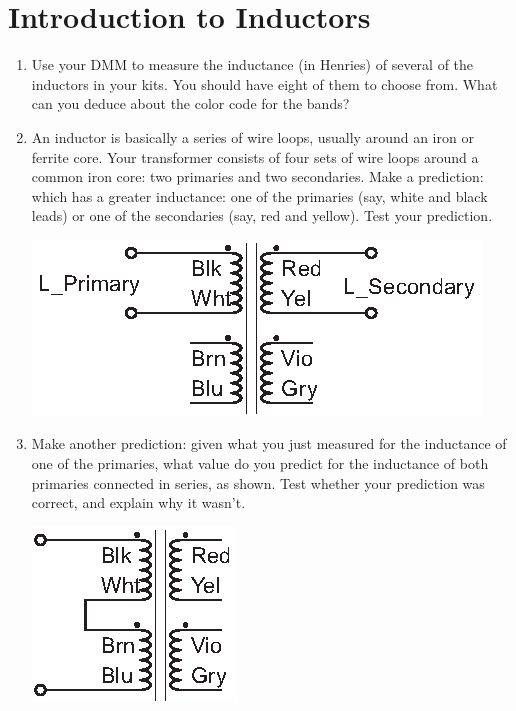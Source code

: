 \section{Introduction to Inductors}
\label{lab_inductors}


\bigskip

\begin{enumerate}[wide]

\item Use your DMM to measure the inductance (in Henries) of several of the inductors in your kits.  You should have eight of them to choose from.  What can you deduce about the color code for the bands?

\item An inductor is basically a series of wire loops, usually around an iron or ferrite core.  Your transformer consists of four sets of wire loops around a common iron core: two primaries and two secondaries.  Make a prediction: which has a greater inductance: one of the primaries (say, white and black leads) or one of the secondaries (say, red and yellow).  Test your prediction.
\begin{center}
\includegraphics{inductors/transformer_as_inductor1.eps}
\end{center}

\item Make another prediction: given what you just measured for the inductance of one of the primaries, what value do you predict for the inductance of both primaries connected in series, as shown.  Test whether your prediction was correct, and explain why it wasn't. 
\begin{center}
\includegraphics{inductors/transformer_as_inductor2.eps}
\end{center}
 

\end{enumerate}
